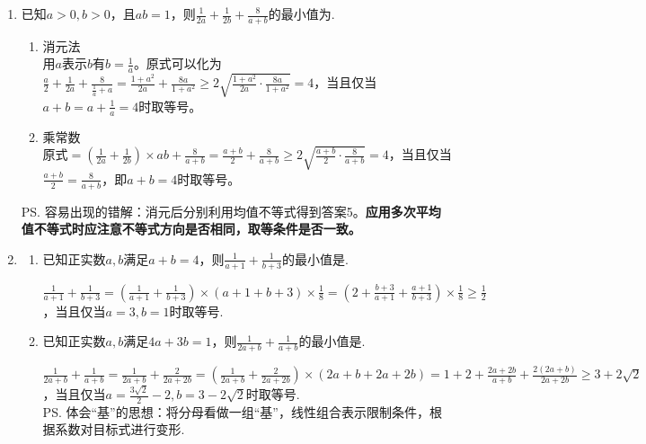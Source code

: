\begin{enumerate}
\begin{jieda}
    故$a^2+\frac{16}{b(a-b)} \geq a^2 + \frac{64}{a^2} \geq 16$. 取等条件为$a = 2\sqrt{2}, b = \sqrt{2}$
    \end{jieda}
    \item 已知$a > 0, b > 0$，且$ab = 1$，则$\frac{1}{2a} + \frac{1}{2b} + \frac{8}{a+b}$的最小值为.
    \begin{jieda}
        \begin{enumerate}
            \item 消元法 \\
            用$a$表示$b$有$b = \frac{1}{a}$。原式可以化为$\frac{a}{2} + \frac{1}{2a} + \frac{8}{\frac{1}{a} + a} = \frac{1+a^2}{2a} + \frac{8a}{1+a^2} \geq 2\sqrt{\frac{1+a^2}{2a} \cdot \frac{8a}{1+a^2}} = 4$，当且仅当$a+b = a + \frac{1}{a} = 4$时取等号。 
            \item 乘常数 \\
            原式$=(\frac{1}{2a} + \frac{1}{2b}) \times ab + \frac{8}{a+b} = \frac{a+b}{2} + \frac{8}{a+b} \geq 2\sqrt{\frac{a+b}{2} \cdot \frac{8}{a+b}} = 4$，当且仅当$\frac{a+b}{2} = \frac{8}{a+b}$，即$a+b=4$时取等号。
        \end{enumerate}
        \ps 容易出现的错解：消元后分别利用均值不等式得到答案5。\textbf{应用多次平均值不等式时应注意不等式方向是否相同，取等条件是否一致。}
    \end{jieda}
    \item 
    \begin{enumerate}
        \item 已知正实数$a, b$满足$a+b = 4$，则$\frac{1}{a+1} + \frac{1}{b+3}$的最小值是.
        \begin{jieda}
            $\frac{1}{a+1} + \frac{1}{b+3} = (\frac{1}{a+1} + \frac{1}{b+3}) \times (a+1+b+3) \times \frac{1}{8} = (2+\frac{b+3}{a+1} + \frac{a+1}{b+3}) \times \frac{1}{8} \geq \frac{1}{2}$，当且仅当$a = 3, b = 1$时取等号.
        \end{jieda}
        \item 已知正实数$a, b$满足$4a+3b = 1$，则$\frac{1}{2a+b} + \frac{1}{a+b}$的最小值是.
        \begin{jieda}
            $\frac{1}{2a+b} + \frac{1}{a+b} = \frac{1}{2a+b} + \frac{2}{2a+2b} = (\frac{1}{2a+b} + \frac{2}{2a+2b}) \times (2a + b + 2a + 2b) = 1 + 2 + \frac{2a+2b}{a+b} + \frac{2(2a+b)}{2a+2b} \geq 3+2\sqrt{2}$，当且仅当$a = \frac{3\sqrt{2}}{2}-2, b = 3-2\sqrt{2}$时取等号. \\
            \ps 体会“基”的思想：将分母看做一组“基”，线性组合表示限制条件，根据系数对目标式进行变形.

\end{jieda}
\end{enumerate}
\end{enumerate}
